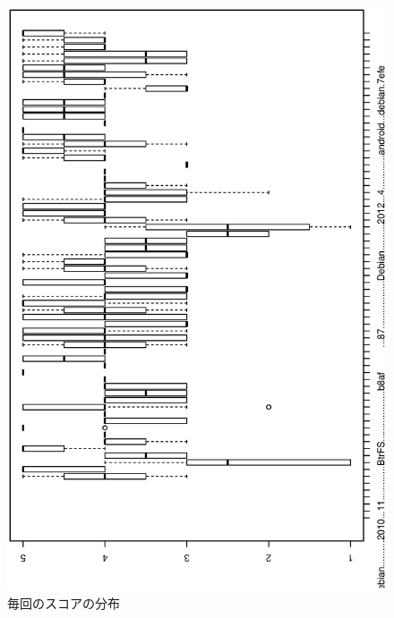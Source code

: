 \documentclass[mingoth,a4paper]{jsarticle}
\begin{document}
\begin{figure}[ht]
\begin{minipage}{0.5\hsize}
 \begin{center}
  \includegraphics[width=0.8\hsize,angle=270]{image201301/enquete_boxplot.eps}
 \end{center} 
 \caption{毎回のスコアの分布}\label{fig:enquete-score-distribution}
\end{minipage}
\begin{minipage}{0.5\hsize}
\begin{center}

\end{center}
\end{minipage}
\end{figure}
\end{document}

